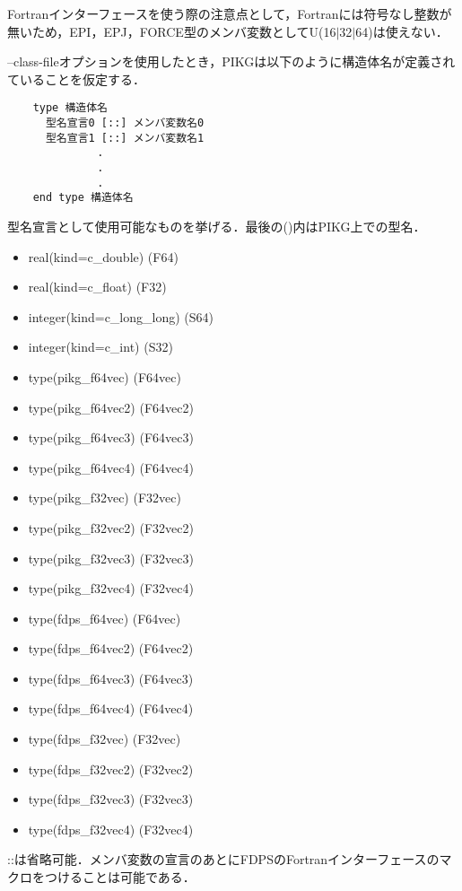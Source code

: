 \documentclass{article}
\begin{document}
Fortranインターフェースを使う際の注意点として，Fortranには符号なし整数が無いため，EPI，EPJ，FORCE型のメンバ変数としてU(16$|$32$|$64)は使えない．

--class-fileオプションを使用したとき，PIKGは以下のように構造体名が定義されていることを仮定する．
\begin{verbatim}
	type 構造体名
	  型名宣言0 [::] メンバ変数名0
	  型名宣言1 [::] メンバ変数名1
	          .
	          .
	          .
	end type 構造体名
\end{verbatim}型名宣言として使用可能なものを挙げる．最後の()内はPIKG上での型名．
 \begin{itemize}
  \item real(kind=c\_double) (F64)
  \item real(kind=c\_float) (F32)
  \item integer(kind=c\_long\_long) (S64)
  \item integer(kind=c\_int) (S32)
  \item type(pikg\_f64vec) (F64vec)
  \item type(pikg\_f64vec2) (F64vec2)
  \item type(pikg\_f64vec3) (F64vec3)
  \item type(pikg\_f64vec4) (F64vec4)
  \item type(pikg\_f32vec) (F32vec)
  \item type(pikg\_f32vec2) (F32vec2)
  \item type(pikg\_f32vec3) (F32vec3)
  \item type(pikg\_f32vec4) (F32vec4)
  \item type(fdps\_f64vec) (F64vec)
  \item type(fdps\_f64vec2) (F64vec2)
  \item type(fdps\_f64vec3) (F64vec3)
  \item type(fdps\_f64vec4) (F64vec4)
  \item type(fdps\_f32vec) (F32vec)
  \item type(fdps\_f32vec2) (F32vec2)
  \item type(fdps\_f32vec3) (F32vec3)
  \item type(fdps\_f32vec4) (F32vec4)
 \end{itemize}
 ::は省略可能．メンバ変数の宣言のあとにFDPSのFortranインターフェースのマクロをつけることは可能である．
\end{document}
